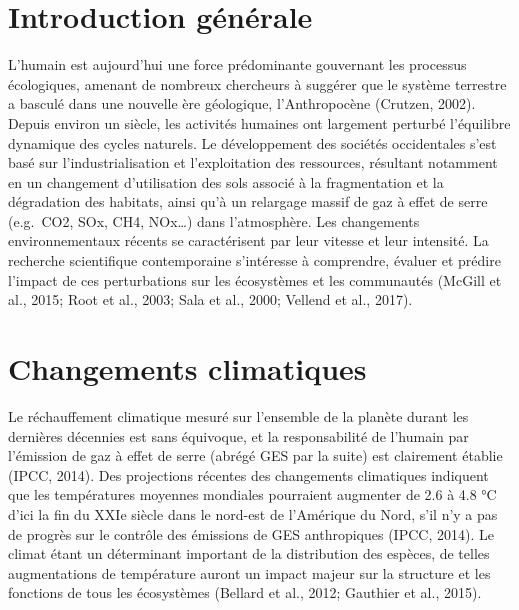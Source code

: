\documentclass[
]{article}
\date{}
\begin{document}
\hypertarget{introduction-guxe9nuxe9rale}{%
\section{Introduction générale}\label{introduction-guxe9nuxe9rale}}

L'humain est aujourd'hui une force prédominante gouvernant les processus
écologiques, amenant de nombreux chercheurs à suggérer que le système
terrestre a basculé dans une nouvelle ère géologique, l'Anthropocène
(Crutzen, 2002). Depuis environ un siècle, les activités humaines ont
largement perturbé l'équilibre dynamique des cycles naturels. Le
développement des sociétés occidentales s'est basé sur
l'industrialisation et l'exploitation des ressources, résultant
notamment en un changement d'utilisation des sols associé à la
fragmentation et la dégradation des habitats, ainsi qu'à un relargage
massif de gaz à effet de serre (e.g.~CO2, SOx, CH4, NOx\ldots) dans
l'atmosphère. Les changements environnementaux récents se caractérisent
par leur vitesse et leur intensité. La recherche scientifique
contemporaine s'intéresse à comprendre, évaluer et prédire l'impact de
ces perturbations sur les écosystèmes et les communautés (McGill et al.,
2015; Root et al., 2003; Sala et al., 2000; Vellend et al., 2017).

\hypertarget{changements-climatiques}{%
\section{Changements climatiques}\label{changements-climatiques}}

Le réchauffement climatique mesuré sur l'ensemble de la planète durant
les dernières décennies est sans équivoque, et la responsabilité de
l'humain par l'émission de gaz à effet de serre (abrégé GES par la
suite) est clairement établie (IPCC, 2014). Des projections récentes des
changements climatiques indiquent que les températures moyennes
mondiales pourraient augmenter de 2.6 à 4.8 °C d'ici la fin du XXIe
siècle dans le nord-est de l'Amérique du Nord, s'il n'y a pas de progrès
sur le contrôle des émissions de GES anthropiques (IPCC, 2014). Le
climat étant un déterminant important de la distribution des espèces, de
telles augmentations de température auront un impact majeur sur la
structure et les fonctions de tous les écosystèmes (Bellard et al.,
2012; Gauthier et al., 2015).
\end{document}
